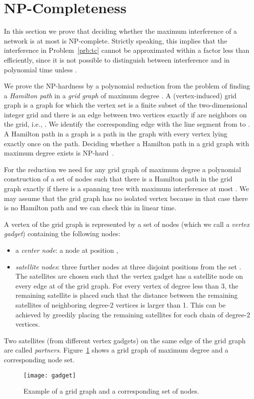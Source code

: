 \documentclass{article}
\theoremstyle{plain}
\theoremstyle{definition}
\theoremstyle{remark}
\begin{document}
\section{NP-Completeness}
In this section we prove that deciding whether the maximum interference
of a network is at most  is NP-complete. Strictly speaking, this
implies that the interference in Problem~\ref{prb:tc} cannot be
approximated within a factor less than  efficiently, since
it is not possible to distinguish between interference  and  in
polynomial time unless .

We prove the NP-hardness by a polynomial reduction from the problem of finding a \emph{Hamilton path} in a
\emph{grid graph} of maximum degree . A (vertex-induced) grid graph is a graph for which the vertex set is a finite subset of
the two-dimensional integer grid  and there is an edge between two
vertices  exactly if  are neighbors on the grid, i.e., . We identify the corresponding
edge with the line segment from  to .
A Hamilton path in
a graph is a path in the graph with every vertex lying exactly once on the path. Deciding whether a Hamilton
path in a grid graph with maximum degree  exists is NP-hard~\cite{pv-tgp-84}.

For the reduction we need for any grid graph of maximum degree  a polynomial construction of a set of nodes such that
there is a Hamilton path in the grid graph exactly if there is a spanning tree with maximum interference at most .
We may assume that the grid graph has no isolated vertex because in that case there is no Hamilton path and
we can check this in linear time.

A vertex  of the grid graph is represented by a set of nodes
(which we call a \emph{vertex gadget}) containing the following nodes:
\begin{itemize}
\item a \emph{center node}: a node at position ,
\item \emph{satellite nodes}: three further nodes at three disjoint positions from the set . The
satellites are chosen such that the vertex gadget has a satellite node on every edge at  of the
grid graph. For every vertex of degree less than 3, the remaining satellite is placed such that the distance between the remaining satellites of neighboring degree-2 vertices is larger than 1. This can be achieved by greedily placing the remaining satellites for each chain of degree-2 vertices.
\end{itemize}
Two satellites (from different vertex gadgets) on the same edge of the grid graph are called
\emph{partners}. Figure~\ref{fig:gadget} shows a grid graph of maximum degree  and a
corresponding node set.
\begin{figure}
  \centering
  \texttt{[image: gadget]}
  \caption{Example of a grid graph and a corresponding set of nodes.}
  \label{fig:gadget}
\end{figure}
\end{document}
